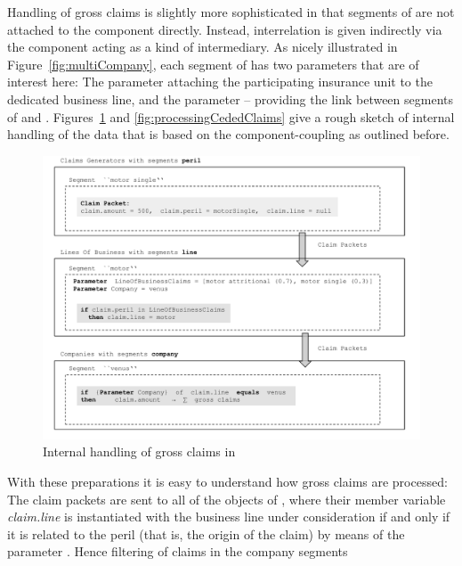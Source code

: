 Handling of gross claims is slightly more sophisticated in that segments of  are not attached to the component  directly.
Instead, interrelation is given indirectly via the component  acting
as a kind of intermediary.
As nicely illustrated in Figure~\ref{fig:multiCompany}, each segment of  has two parameters that are of interest here:
The parameter  attaching the participating insurance unit to the dedicated
business line, and the parameter  -- 
providing the link between segments of  and .
Figures~\ref{fig:processingGrossClaims} and \ref{fig:processingCededClaims}
give a rough sketch of internal handling of the data that is based on the component-coupling
as outlined before.
\begin{figure}[htb]
	\centering
	\includegraphics[scale=0.45]{images/ProcessingGrossClaims.pdf}
	\caption{Internal handling of gross claims in }
	\label{fig:processingGrossClaims}
\end{figure}
With these preparations it is easy to understand how gross claims are processed:
The claim packets are sent to all of the objects of , where their
member variable {\em claim.line} is instantiated with the business line under consideration
if and only if it is related to the peril (that is, the origin of the claim) by means of the
parameter . Hence filtering of claims in the company segments

